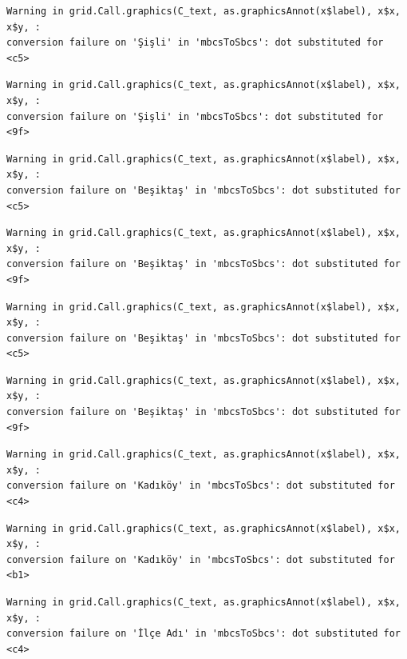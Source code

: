 \documentclass[
  11pt,
  a4paper,
  DIV=11,
  numbers=noendperiod]{scrartcl}
\begin{document}
\begin{verbatim}
Warning in grid.Call.graphics(C_text, as.graphicsAnnot(x$label), x$x, x$y, :
conversion failure on 'Şişli' in 'mbcsToSbcs': dot substituted for <c5>
\end{verbatim}

\begin{verbatim}
Warning in grid.Call.graphics(C_text, as.graphicsAnnot(x$label), x$x, x$y, :
conversion failure on 'Şişli' in 'mbcsToSbcs': dot substituted for <9f>
\end{verbatim}

\begin{verbatim}
Warning in grid.Call.graphics(C_text, as.graphicsAnnot(x$label), x$x, x$y, :
conversion failure on 'Beşiktaş' in 'mbcsToSbcs': dot substituted for <c5>
\end{verbatim}

\begin{verbatim}
Warning in grid.Call.graphics(C_text, as.graphicsAnnot(x$label), x$x, x$y, :
conversion failure on 'Beşiktaş' in 'mbcsToSbcs': dot substituted for <9f>
\end{verbatim}

\begin{verbatim}
Warning in grid.Call.graphics(C_text, as.graphicsAnnot(x$label), x$x, x$y, :
conversion failure on 'Beşiktaş' in 'mbcsToSbcs': dot substituted for <c5>
\end{verbatim}

\begin{verbatim}
Warning in grid.Call.graphics(C_text, as.graphicsAnnot(x$label), x$x, x$y, :
conversion failure on 'Beşiktaş' in 'mbcsToSbcs': dot substituted for <9f>
\end{verbatim}

\begin{verbatim}
Warning in grid.Call.graphics(C_text, as.graphicsAnnot(x$label), x$x, x$y, :
conversion failure on 'Kadıköy' in 'mbcsToSbcs': dot substituted for <c4>
\end{verbatim}

\begin{verbatim}
Warning in grid.Call.graphics(C_text, as.graphicsAnnot(x$label), x$x, x$y, :
conversion failure on 'Kadıköy' in 'mbcsToSbcs': dot substituted for <b1>
\end{verbatim}

\begin{verbatim}
Warning in grid.Call.graphics(C_text, as.graphicsAnnot(x$label), x$x, x$y, :
conversion failure on 'İlçe Adı' in 'mbcsToSbcs': dot substituted for <c4>
\end{verbatim}
\end{document}
